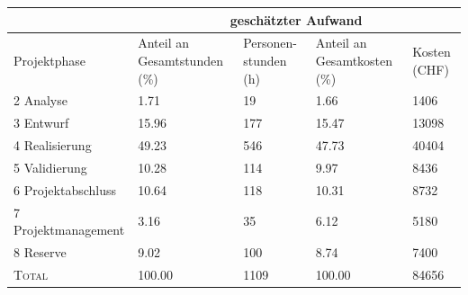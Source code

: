 \begin{center}
    \label{tab:persCost}
    \begin{tabular}{lp{20mm}p{20mm}p{20mm}p{20mm}}
        \toprule
                           & \multicolumn{4}{c}{gesch\"atzter Aufwand} \\
        \midrule
        Projektphase       & Anteil an Gesamtstunden (\%) & Personen-stunden (h) & Anteil an Gesamtkosten (\%) & Kosten (CHF) \\
        \midrule
        2 Analyse            &                         1.71 &                  19 &                        1.66 &        1406 \\
        3 Entwurf            &                        15.96 &                 177 &                       15.47 &       13098 \\
        4 Realisierung       &                        49.23 &                 546 &                       47.73 &       40404 \\
        5 Validierung        &                        10.28 &                 114 &                        9.97 &        8436 \\
        6 Projektabschluss   &                        10.64 &                 118 &                       10.31 &        8732 \\
        7 Projektmanagement  &                         3.16 &                  35 &                        6.12 &        5180 \\
        8 Reserve            &                         9.02 &                 100 &                        8.74 &        7400 \\
        \midrule
        \textsc{Total}       &                       100.00 &                1109 &                      100.00 &       84656 \\
        \bottomrule
    \end{tabular}
\end{center}
